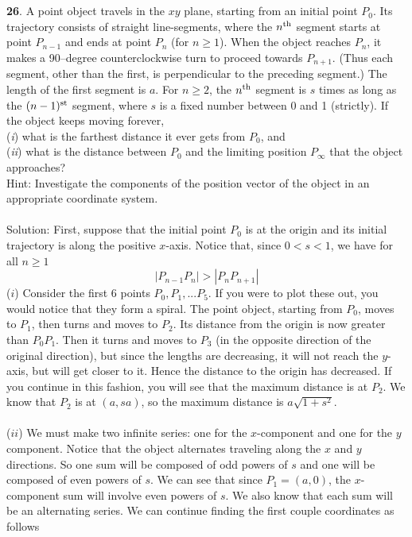 \documentclass[12pt]{amsbook}
\begin{document}
\\
\\
{\small\bf 26}. A point object travels in the
$xy$ plane, starting from an initial point $P_0$.  Its
trajectory consists of straight line-segments, where the
$n^{\rm th}$ segment starts at point $P_{n-1}$ and ends at
point $P_n$ (for $n\geq 1$). When the object reaches $P_n$,
it makes a 90--degree counterclockwise turn to proceed towards
$P_{n+1}$. (Thus each segment, other than the first, is
perpendicular to the preceding segment.) The length of the
first segment is $a$. For $n\geq 2$, the $n^{\rm th}$ segment
is $s$ times as long as the $(n-1)^{\rm st}$ segment, where
$s$ is a fixed number between 0 and 1 (strictly). If the
object keeps moving forever,\\
 ({\it i}) what is the farthest distance
it ever gets from $P_0$, and \\
({\it ii}) what is the distance between
$P_0$ and the limiting position $P_\infty$ that the object
approaches?\\
 Hint:
Investigate the components of the position vector 
of the object in an appropriate coordinate system.
\\
\\ 
{\sc Solution}:
First, suppose that the initial point $P_0$ is at the origin and its initial trajectory is along the positive $x$-axis. Notice that, since $0<s<1$, we have for all $n \geq 1$ $$|P_{n-1}P_{n}|>|P_{n}P_{n+1}|$$
($i$)
Consider the first 6 points $P_0,P_1,...P_5$. If you were to plot these out, you would notice that they form a spiral. The point object, starting from $P_0$, moves to $P_1$, then turns and moves to $P_2$. Its distance from the origin is now greater than $P_0P_1$. Then it turns and moves to $P_3$ (in the opposite direction of the original direction), but since the lengths are decreasing, it will not reach the $y$-axis, but will get closer to it. Hence the distance to the origin has decreased. If you continue in this fashion, you will see that the maximum distance is at $P_2$. We know that $P_2$ is at $(a,sa)$, so the maximum distance is $a\sqrt{1+s^2}$.
\\
\\
($ii$) We must make two infinite series: one for the $x$-component and one for the $y$ component. Notice that the object alternates traveling along the $x$ and $y$ directions. So one sum will be composed of odd powers of $s$ and one will be composed of even powers of $s$. We can see that since $P_1=(a,0)$, the $x$-component sum will involve even powers of $s$. We also know that each sum will be an alternating series. We can continue finding the first couple coordinates as follows
\end{document}
